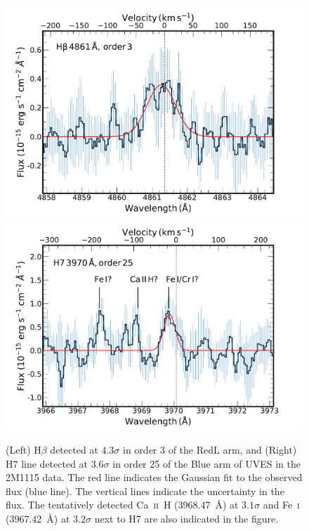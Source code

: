 \documentclass{aa}
\begin{document}
\begin{appendix}
\begin{figure}[!htb]
    \centering
    \includegraphics[width=0.49\linewidth]{Hbeta_order3.pdf}
    \includegraphics[width=0.49\linewidth]{H7_Ca_Fe.pdf}
    \caption{(Left) H$\beta$ detected at $4.3\sigma$ in order 3 of the RedL arm, and (Right) H7 line detected at $3.6\sigma$ in order 25 of the Blue arm of UVES in the 2M1115 data. The red line indicates the Gaussian fit to the observed flux (blue line). The vertical lines indicate the uncertainty in the flux. The tentatively detected Ca~\textsc{ii}~H (3968.47~\AA) at $3.1\sigma$ and Fe~\textsc{i} (3967.42~\AA) at $3.2\sigma$ next to H7 are also indicated in the figure.}
    \label{H3-H7}
\end{figure}


\end{appendix}
\end{document}

